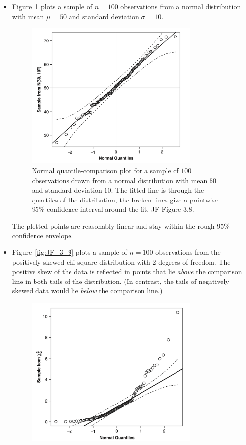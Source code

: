 \begin{itemize}
  \item Figure~\ref{fig:JF_3_8} plots a sample of $n=100$ observations from a normal distribution with mean $\mu = 50$ and standard deviation $\sigma = 10$.
%
\begin{figure}[H]
	\begin{center}
		\includegraphics[width=0.8\textwidth]{Lecture18/JF_3_8}
		\caption{
			Normal quantile-comparison plot for a sample of $100$ observations drawn from a normal distribution with mean $50$ and standard deviation $10$.
			The fitted line is through the quartiles of the distribution, the broken lines give a pointwise 95\% confidence interval around the fit.
			JF Figure 3.8.}
		\label{fig:JF_3_8}
	\end{center}
\end{figure}
%  
  The plotted points are reasonably linear and stay within the rough 95\% confidence envelope.
  \item Figure~\ref{fig:JF_3_9} plots a sample of $n=100$ observations from the positively skewed chi-square distribution with 2 degrees of freedom.
  The positive skew of the data is reflected in points that lie {\it above} the comparison line in both tails of the distribution. (In contrast, the tails of negatively skewed data would lie {\it below} the comparison line.)
%
\begin{figure}[H]
	\begin{center}
		\includegraphics[width=0.8\textwidth]{Lecture18/JF_3_9}

\end{center}
\end{figure}
\end{itemize}
